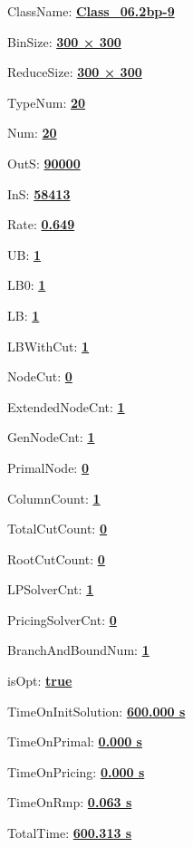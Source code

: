 \documentclass[11pt]{article}
\begin{document}
\pagestyle{empty}


ClassName: \underline{\textbf{Class_06.2bp-9}}
\par
BinSize: \underline{\textbf{300 × 300}}
\par
ReduceSize: \underline{\textbf{300 × 300}}
\par
TypeNum: \underline{\textbf{20}}
\par
Num: \underline{\textbf{20}}
\par
OutS: \underline{\textbf{90000}}
\par
InS: \underline{\textbf{58413}}
\par
Rate: \underline{\textbf{0.649}}
\par
UB: \underline{\textbf{1}}
\par
LB0: \underline{\textbf{1}}
\par
LB: \underline{\textbf{1}}
\par
LBWithCut: \underline{\textbf{1}}
\par
NodeCut: \underline{\textbf{0}}
\par
ExtendedNodeCnt: \underline{\textbf{1}}
\par
GenNodeCnt: \underline{\textbf{1}}
\par
PrimalNode: \underline{\textbf{0}}
\par
ColumnCount: \underline{\textbf{1}}
\par
TotalCutCount: \underline{\textbf{0}}
\par
RootCutCount: \underline{\textbf{0}}
\par
LPSolverCnt: \underline{\textbf{1}}
\par
PricingSolverCnt: \underline{\textbf{0}}
\par
BranchAndBoundNum: \underline{\textbf{1}}
\par
isOpt: \underline{\textbf{true}}
\par
TimeOnInitSolution: \underline{\textbf{600.000 s}}
\par
TimeOnPrimal: \underline{\textbf{0.000 s}}
\par
TimeOnPricing: \underline{\textbf{0.000 s}}
\par
TimeOnRmp: \underline{\textbf{0.063 s}}
\par
TotalTime: \underline{\textbf{600.313 s}}
\par
\newpage
\end{document}
